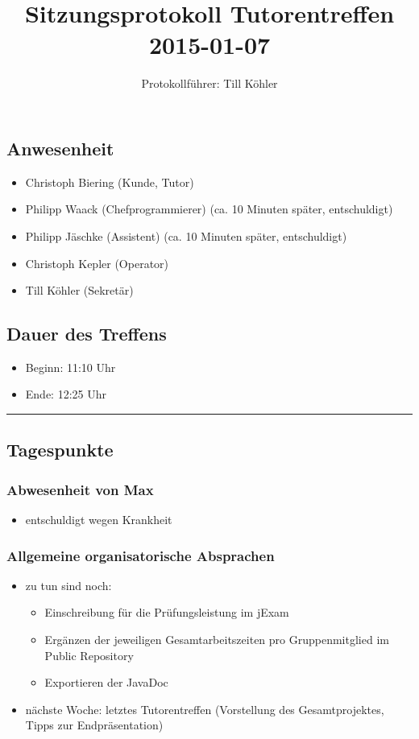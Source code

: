 \documentclass[12pt,a4paper]{article}
\author{Protokollführer: Till Köhler}
\title{Sitzungsprotokoll Tutorentreffen 2015-01-07}
\date{}
\begin{document}
\maketitle

\subsection*{Anwesenheit}
\medskip
\begin{itemize}
\item Christoph Biering (Kunde, Tutor)
\item Philipp Waack (Chefprogrammierer) (ca. 10 Minuten später, entschuldigt)
\item Philipp Jäschke (Assistent) (ca. 10 Minuten später, entschuldigt)
\item Christoph Kepler (Operator)
\item Till Köhler (Sekretär)
\end{itemize}

\subsection*{Dauer des Treffens}
\medskip
\begin{itemize}
\item Beginn: 11:10 Uhr
\item Ende: 12:25 Uhr
\end{itemize}

\noindent\rule{\textwidth}{1pt}

\subsection*{Tagespunkte}
\medskip

\subsubsection*{Abwesenheit von Max}
\begin{itemize}
\item entschuldigt wegen Krankheit
\end{itemize}

\subsubsection*{Allgemeine organisatorische Absprachen}
\begin{itemize}
\item zu tun sind noch:
\begin{itemize}
\item Einschreibung für die Prüfungsleistung im jExam
\item Ergänzen der jeweiligen Gesamtarbeitszeiten pro Gruppenmitglied im Public Repository
\item Exportieren der JavaDoc
\end{itemize}
\item nächste Woche: letztes Tutorentreffen (Vorstellung des Gesamtprojektes, Tipps zur Endpräsentation)
\end{itemize}
\end{document}
